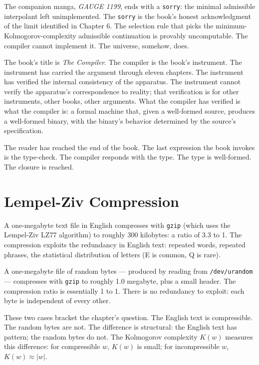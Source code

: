 \begin{chapteressay}
The companion manga, \emph{GAUGE 1199}, ends with a
\texttt{sorry}: the minimal admissible interpolant left
unimplemented. The \texttt{sorry} is the book's honest
acknowledgment of the limit identified in Chapter 6. The
selection rule that picks the minimum-Kolmogorov-complexity
admissible continuation is provably uncomputable. The
compiler cannot implement it. The universe, somehow, does.

The book's title is \emph{The Compiler}. The compiler is the
book's instrument. The instrument has carried the argument
through eleven chapters. The instrument has verified the
internal consistency of the apparatus. The instrument cannot
verify the apparatus's correspondence to reality; that
verification is for other instruments, other books, other
arguments. What the compiler has verified is what the compiler
is: a formal machine that, given a well-formed source, produces
a well-formed binary, with the binary's behavior determined by
the source's specification.

The reader has reached the end of the book. The last expression
the book invokes is the type-check. The compiler responds with
the type. The type is well-formed. The closure is reached.

\end{chapteressay}

\section{Lempel-Ziv Compression}
\label{se:lempel-ziv-compression}

A one-megabyte text file in English compresses with \texttt{gzip}
(which uses the Lempel-Ziv LZ77 algorithm) to roughly 300 kilobytes:
a ratio of 3.3 to 1. The compression exploits the redundancy in
English text: repeated words, repeated phrases, the statistical
distribution of letters (E is common, Q is rare).

A one-megabyte file of random bytes --- produced by reading from
\texttt{/dev/urandom} --- compresses with \texttt{gzip} to roughly
1.0 megabyte, plus a small header. The compression ratio is
essentially 1 to 1. There is no redundancy to exploit: each byte is
independent of every other.

These two cases bracket the chapter's question. The English text
is compressible. The random bytes are not. The difference is
structural: the English text has pattern; the random bytes do
not. The Kolmogorov complexity $K(w)$ measures this difference:
for compressible $w$, $K(w)$ is small; for incompressible $w$,
$K(w) \approx |w|$.

